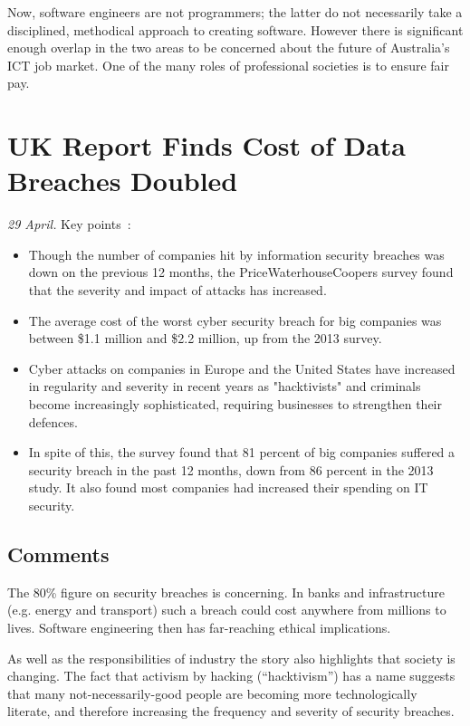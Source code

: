 \documentclass[11pt,a4paper]{report}
\begin{document}
	Now, software engineers are not programmers; the latter do not necessarily take a disciplined, methodical approach to creating software. However there is significant enough overlap in the two areas to be concerned about the future of Australia's ICT job market. One of the many roles of professional societies is to ensure fair pay.
	
	\section{UK Report Finds Cost of Data Breaches Doubled}
	\textit{29 April.} Key points~\cite{news7}:
	\begin{itemize}
		\item Though the number of companies hit by information security breaches was down on the previous 12 months, the PriceWaterhouseCoopers survey found that the severity and impact of attacks has increased.
		\item The average cost of the worst cyber security breach for big companies was between \$1.1 million and \$2.2 million, up from the 2013 survey.
		\item Cyber attacks on companies in Europe and the United States have increased in regularity and severity in recent years as "hacktivists" and criminals become increasingly sophisticated, requiring businesses to strengthen their defences.
		\item In spite of this, the survey found that 81 percent of big companies suffered a security breach in the past 12 months, down from 86 percent in the 2013 study. It also found most companies had increased their spending on IT security.
	\end{itemize}
	
	\subsection{Comments}
	The 80\% figure on security breaches is concerning. In banks and infrastructure (e.g. energy and transport) such a breach could cost anywhere from millions to lives. Software engineering then has far-reaching ethical implications.
	
	As well as the responsibilities of industry the story also highlights that society is changing. The fact that activism by hacking (``hacktivism'') has a name suggests that many not-necessarily-good people are becoming more technologically literate, and therefore increasing the frequency and severity of security breaches.
	
\end{document}
